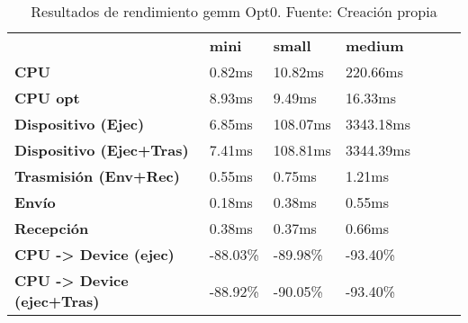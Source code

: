 \begin{table}[H]
    \centering
    \begin{tabular}{lllllll}
    \rowcolor[HTML]{DAE8FC} \ &  \textbf{mini} &  \textbf{	small} &  \textbf{	medium} \\
    \cellcolor[HTML]{DAE8FC} \textbf{CPU} & 0.82ms & 	10.82ms & 	220.66ms \\
    \rowcolor[HTML]{EFEFEF} \cellcolor[HTML]{DAE8FC} \textbf{CPU opt} & 8.93ms & 	9.49ms & 	16.33ms \\
    \cellcolor[HTML]{DAE8FC} \textbf{Dispositivo (Ejec)} & 6.85ms & 	108.07ms & 	3343.18ms \\
    \rowcolor[HTML]{EFEFEF} \cellcolor[HTML]{DAE8FC} \textbf{Dispositivo (Ejec+Tras)} & 7.41ms & 	108.81ms & 	3344.39ms \\
    \cellcolor[HTML]{DAE8FC} \textbf{Trasmisión (Env+Rec)} & 0.55ms & 	0.75ms & 	1.21ms \\
    \rowcolor[HTML]{EFEFEF} \cellcolor[HTML]{DAE8FC} \textbf{Envío} & 0.18ms & 	0.38ms & 	0.55ms \\
    \cellcolor[HTML]{DAE8FC} \textbf{Recepción} & 0.38ms & 	0.37ms & 	0.66ms \\
    \rowcolor[HTML]{EFEFEF} \cellcolor[HTML]{DAE8FC} \textbf{CPU -> Device (ejec)} & -88.03\% & 	-89.98\% & 	-93.40\% \\
    \cellcolor[HTML]{DAE8FC} \textbf{CPU -> Device (ejec+Tras)} & -88.92\% & 	-90.05\% & 	-93.40\% \\
    \end{tabular}
    \caption[Resultados de rendimiento gemm Opt0]{{Resultados de rendimiento gemm Opt0. Fuente: Creación propia}}
    \label{table_test_gemm_Opt0_hw_performanceResults}
\end{table}